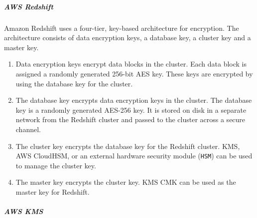 \documentclass[10pt]{article}
\begin{document}
\subparagraph{AWS Redshift}
Amazon Redshift uses a four-tier, key-based architecture for encryption. The architecture consists of data encryption keys, a database key, a cluster key and a master key.
\\
\begin{enumerate}
	\item Data encryption keys encrypt data blocks in the cluster. Each data block is assigned a randomly generated 256-bit AES key. These keys are encrypted by using the database key for the cluster.
	\item The database key encrypts data encryption keys in the cluster. The database key is a randomly generated AES-256 key. It is stored on disk in a separate network from the Redshift cluster and passed to the cluster across a secure channel.
	\item The cluster key encrypts the database key for the Redshift cluster.  KMS, AWS CloudHSM, or an external hardware security module (\texttt{HSM}) can be used to manage the cluster key.
	\item The master key encrypts the cluster key. KMS CMK can be used as the master key for Redshift.
\end{enumerate}


\subparagraph{AWS KMS}
\end{document}
